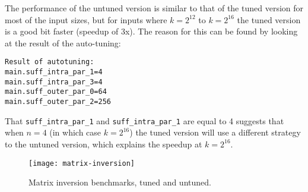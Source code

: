 \documentclass{article}
\begin{document}
The performance of the untuned version is similar to that of the tuned version
for most of the input sizes, but for inputs where $k = 2^{12}$ to $k=2^{16}$ the
tuned version is a good bit faster (speedup of \textapprox 3x). The reason
for this can be found by looking at the result of the auto-tuning:
\begin{Verbatim}
Result of autotuning:
main.suff_intra_par_1=4
main.suff_intra_par_3=4
main.suff_outer_par_0=64
main.suff_outer_par_2=256
\end{Verbatim}
That \verb|suff_intra_par_1| and \verb|suff_intra_par_1| are equal to 4 suggests
that when $n=4$ (in which case $k=2^{16}$) the tuned version will use a
different strategy to the untuned version, which explains the speedup at $k =
2^{16}$.

\begin{figure}[t]
    \centering
    \texttt{[image: matrix-inversion]}
    \caption{Matrix inversion benchmarks, tuned and untuned.}
    \label{fig:matrix_inv_bench}
\end{figure}
\end{document}
